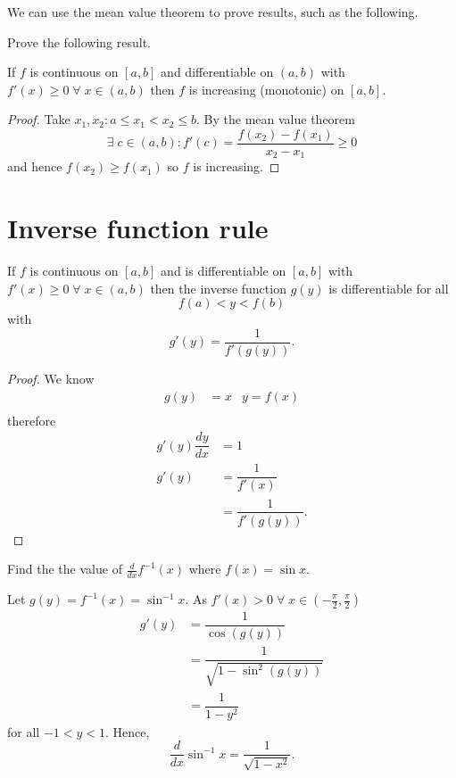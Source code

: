 We can use the mean value theorem to prove results, such as the following.

\begin{example}
    Prove the following result.
    
    If $f$ is continuous on $[a,b]$ and differentiable on $(a,b)$ with $f'(x)\geq0\;\forall\;x\in(a,b)$ then $f$ is increasing (monotonic) on $[a,b]$.
    
    \begin{proof}
        Take $x_1,x_2:a\leq x_1<x_2\leq b$. By the mean value theorem \[\exists\;c\in(a,b):f'(c)=\dfrac{f(x_2)-f(x_1)}{x_2-x_1}\geq0\] and hence $f(x_2)\geq f(x_1)$ so $f$ is increasing.
    \end{proof}
\end{example}

\section{Inverse function rule}

\begin{theorem}
    If $f$ is continuous on $[a,b]$ and is differentiable on $[a,b]$ with $f'(x)\geq 0\;\forall\;x\in(a,b)$ then the inverse function $g(y)$ is differentiable for all \[f(a)<y<f(b)\] with \[g'(y)=\dfrac1{f'(g(y))}.\]
\end{theorem}

\begin{proof}
    We know
    \begin{align*}
        g(y)&=x&y=f(x)\\
    \end{align*}
    therefore
    \begin{align*}
        g'(y)\dfrac{dy}{dx}&=1\\
        g'(y)&=\dfrac1{f'(x)}\\
        &=\dfrac1{f'(g(y))}.
    \end{align*}
\end{proof}

\begin{example}
    Find the the value of $\frac d{dx}f^{-1}(x)$ where $f(x)=\sin{x}$.
    
    Let $g(y)=f^{-1}(x)=\sin^{-1}{x}$. As $f'(x)>0\;\forall\;x\in(-\frac{\pi}2,\frac{\pi}2)$
    \begin{align*}
        g'(y)&=\dfrac1{\cos{(g(y))}}\\
        &=\dfrac1{\sqrt{1-\sin^2{(g(y))}}}\\
        &=\dfrac1{1-y^2}
    \end{align*}
    for all $-1<y<1$. Hence,
    \[\dfrac d{dx}\sin^{-1}{x}=\dfrac{1}{\sqrt{1-x^2}}.\]
\end{example}

